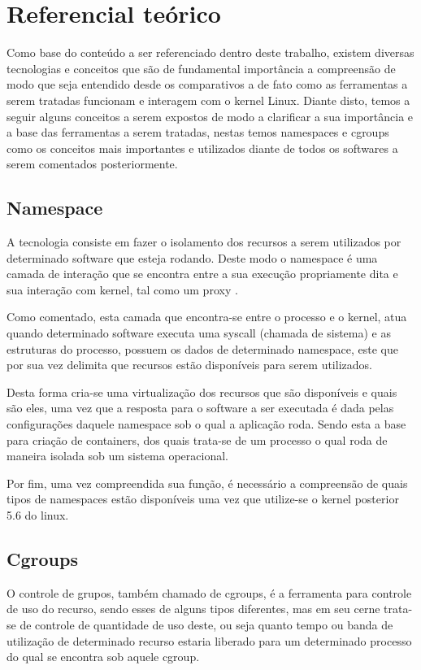 \chapter{Referencial teórico}

Como base do conteúdo a ser referenciado dentro deste trabalho, existem diversas tecnologias e conceitos que são de fundamental importância a compreensão de modo que seja entendido desde os comparativos a de fato como as ferramentas a serem tratadas funcionam e interagem com o kernel Linux. Diante disto, temos a seguir alguns conceitos a serem expostos de modo a clarificar a sua importância e a base das ferramentas a serem tratadas, nestas temos namespaces e cgroups como os conceitos mais importantes e utilizados diante de todos os softwares a serem comentados posteriormente.

\section{Namespace}
A tecnologia consiste em fazer o isolamento dos recursos a serem utilizados por determinado software que esteja rodando. Deste modo o namespace é uma camada de interação que se encontra entre a sua execução propriamente dita e sua interação com kernel, tal como um proxy \cite{kernelscheepers}.

Como comentado, esta camada que encontra-se entre o processo e o kernel, atua quando determinado software executa uma syscall (chamada de sistema) e as estruturas do processo, possuem os dados de determinado namespace, este que por sua vez delimita que recursos estão disponíveis para serem utilizados.

Desta forma cria-se uma virtualização dos recursos que são disponíveis e quais são eles, uma vez que a resposta para o software a ser executada é dada pelas configurações daquele namespace sob o qual a aplicação roda. Sendo esta a base para criação de containers, dos quais trata-se de um processo o qual roda de maneira isolada sob um sistema operacional.

Por fim, uma vez compreendida sua função, é necessário a compreensão de quais tipos de namespaces estão disponíveis uma vez que utilize-se o kernel posterior 5.6 do linux.

\section{Cgroups}
O controle de grupos, também chamado de cgroups, é a ferramenta para controle de uso do recurso, sendo esses de alguns tipos diferentes, mas em seu cerne trata-se de controle de quantidade de uso deste, ou seja quanto tempo ou banda de utilização de determinado recurso estaria liberado para um determinado processo do qual se encontra sob aquele cgroup.

